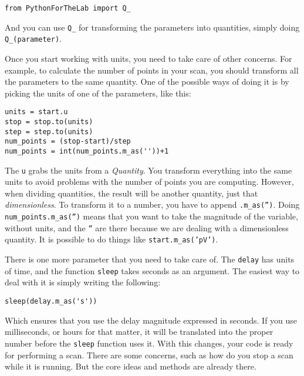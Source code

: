 \begin{verbatim}
from PythonForTheLab import Q_
\end{verbatim}

And you can use \texttt{Q_} for transforming the parameters into
quantities, simply doing \texttt{Q_(parameter)}.


Once you start working with units, you need to take care of other
concerns. For example, to calculate the number of points in your scan,
you should transform all the parameters to the same quantity. One of the
possible ways of doing it is by picking the units of one of the
parameters, like this:

\begin{verbatim}
units = start.u
stop = stop.to(units)
step = step.to(units)
num_points = (stop-start)/step
num_points = int(num_points.m_as(''))+1
\end{verbatim}

The \texttt{u} grabs the units from a \emph{Quantity}. You transform
everything into the same units to avoid problems with the number of
points you are computing. However, when dividing quantities, the result
will be another quantity, just that \emph{dimensionless}. To transform
it to a number, you have to append
\texttt{.m_as('')}. Doing
\texttt{num_points.m_as('')} means
that you want to take the magnitude of the variable, without units, and
the \texttt{''} are there because we
are dealing with a dimensionless quantity. It is possible to do things
like \texttt{start.m_as('pV')}.

There is one more parameter that you need to take care of. The
\texttt{delay} has units of time, and the function \texttt{sleep} takes
seconds as an argument. The easiest way to deal with it is simply
writing the following:

\begin{verbatim}
sleep(delay.m_as('s'))
\end{verbatim}

Which ensures that you use the delay magnitude expressed in seconds. If
you use milliseconds, or hours for that matter, it will be translated
into the proper number before the \texttt{sleep} function uses it. With
this changes, your code is ready for performing a scan. There are some
concerns, such as how do you stop a scan while it is running. But the
core ideas and methods are already there.

